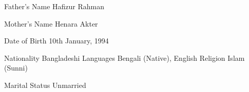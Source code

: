 
\begin{cvpersonals}
  \cvpersonal
    {Father's Name}
    {Hafizur Rahman}

  \cvpersonal
    {Mother's Name}
    {Henara Akter}

  \cvpersonal
    {Date of Birth}
    {10th January, 1994}

  \cvpersonal
    {Nationality}
    {Bangladeshi} 
  \cvpersonal
    {Languages}
    {Bengali (Native), English}
  \cvpersonal
    {Religion}
    {Islam (Sunni)}

  \cvpersonal
    {Marital Status}
    {Unmarried}
\end{cvpersonals}